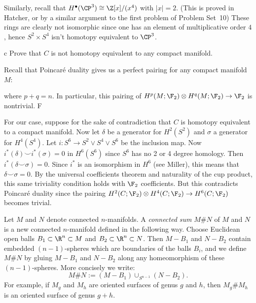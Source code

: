 \documentclass[11pt,letterpaper]{article}
\begin{document}
\begin{solution}
    \quad Similarly, recall that $H^\bullet(\CP^3)\cong \Z[x]/(x^4)$ with $|x|=2$. (This is proved in Hatcher, or by a similar argument to the first problem of Problem Set~10) These rings are clearly not isomorphic since one has an element of multiplicative order $4$, hence $S^2\times S^4$ isn't homotopy equivalent to $\CP^3$.

    \begin{partproblem}{c}
        Prove that $C$ is not homotopy equivalent to any compact manifold.
    \end{partproblem}
    \quad Recall that Poincar\'e duality gives us a perfect pairing for any compact manifold $M$:
    \begin{center}
    \end{center}
    where $p+q=n$. In particular, this pairing of $H^p(M; \F_2)\otimes H^q(M; \F_2) \to \F_2$ is nontrivial. F
    
    \quad For our case, suppose for the sake of contradiction that $C$ is homotopy equivalent to a compact manifold. Now let $\delta$ be a generator for $H^2(S^2)$ and $\sigma$ a generator for $H^4(S^4)$. Let $i : S^6 \to S^2\vee S^4\vee S^6$ be the inclusion map. Now $i^*(\delta)\smile i^*(\sigma) = 0$ in $H^6(S^6)$ since $S^6$ has no 2 or 4 degree homology. Then $i^*(\delta\smile \sigma)=0$. Since $i^*$ is an isomorphism in $H^6$ (see Miller), this means that $\delta\smile \sigma=0$. By the universal coefficients theorem and naturality of the cup product, this same triviality condition holds with $\F_2$ coefficients. But this contradicts Poincar\'e duality since the pairing $H^2(C; \F_2)\otimes H^4(C; \F_2) \to H^6(C; \F_2)$ becomes trivial.
\end{solution}

\begin{problem}
    Let $M$ and $N$ denote connected $n$-manifolds. A \emph{connected sum} $M\# N$ of $M$ and $N$ is a new connected $n$-manifold defined in the following way. Choose Euclidean open balls $B_1\subset \R^n\subset M$ and $B_2\subset \R^n\subset N$. Then $M -B_1$ and $N-B_2$ contain embedded $(n-1)$-spheres which are boundaries of the balls $B_i$, and we define $M\# N$ by gluing $M-B_1$ and $N-B_2$ along any homeomorphism of these $(n-1)$-spheres. More concisely we write:
    \[
        M\# N := (M - B_1)\cup_{S^{n-1}} (N - B_2)
    .\] 
    For example, if $M_g$ and $M_h$ are oriented surfaces of genus $g$ and $h$, then $M_g\# M_h$ is an oriented surface of genus $g+h$.
\end{problem}
\end{document}

